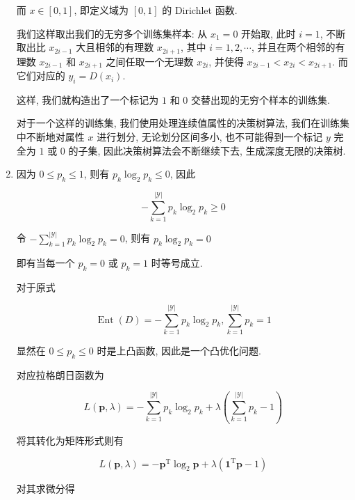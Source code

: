 \documentclass[answers]{exam}  %
\begin{document}
\begin{questions}
\begin{solution}
\begin{enumerate}
            而 $x\in [0,1]$, 即定义域为 $[0,1]$ 的 Dirichlet 函数.

            我们这样取出我们的无穷多个训练集样本: 从 $x_1=0$ 开始取, 此时 $i=1$, 不断取出比 $x_{2i-1}$ 大且相邻的有理数 $x_{2i+1}$, 其中 $i=1,2,\cdots$, 并且在两个相邻的有理数 $x_{2i-1}$ 和 $x_{2i+1}$ 之间任取一个无理数 $x_{2i}$, 并使得 $x_{2i-1} < x_{2i} < x_{2i+1}$. 而它们对应的 $y_{i} = D(x_{i})$.

            这样, 我们就构造出了一个标记为 $1$ 和 $0$ 交替出现的无穷个样本的训练集.

            对于一个这样的训练集, 我们使用处理连续值属性的决策树算法, 我们在训练集中不断地对属性 $x$ 进行划分, 无论划分区间多小, 也不可能得到一个标记 $y$ 完全为 $1$ 或 $0$ 的子集, 因此决策树算法会不断继续下去, 生成深度无限的决策树.

      \item

            因为 $0 \le p_{k} \le 1$, 则有 $p_k\log_2 p_k \le 0$, 因此

            $$
              -\sum_{k=1}^{|\mathcal{Y}|}p_k\log_2 p_k \ge 0
            $$

            令 $-\sum_{k=1}^{|\mathcal{Y}|}p_k\log_2 p_k = 0$, 则有 $p_k\log_2 p_k = 0$

            即有当每一个 $p_k = 0$ 或 $p_k = 1$ 时等号成立.

            对于原式

            $$
              \operatorname{Ent}(D) = -\sum_{k=1}^{|\mathcal{Y}|}p_k\log_2 p_k, \sum_{k=1}^{|\mathcal{Y}|}p_k=1
            $$

            显然在 $0\le p_k\le 0$ 时是上凸函数, 因此是一个凸优化问题.

            对应拉格朗日函数为

            $$
              L(\bm{p}, \lambda) = -\sum_{k=1}^{|\mathcal{Y}|}p_k\log_2 p_k + \lambda(\sum_{k=1}^{|\mathcal{Y}|}p_k-1)
            $$

            将其转化为矩阵形式则有

            $$
              L(\bm{p}, \lambda) = -\bm{p}^{\mathrm{T}}\log_2 \bm{p} + \lambda(\bm{1}^{\mathrm{T}}\bm{p}-1)
            $$

            对其求微分得


\end{enumerate}
\end{solution}
\end{questions}
\end{document}
